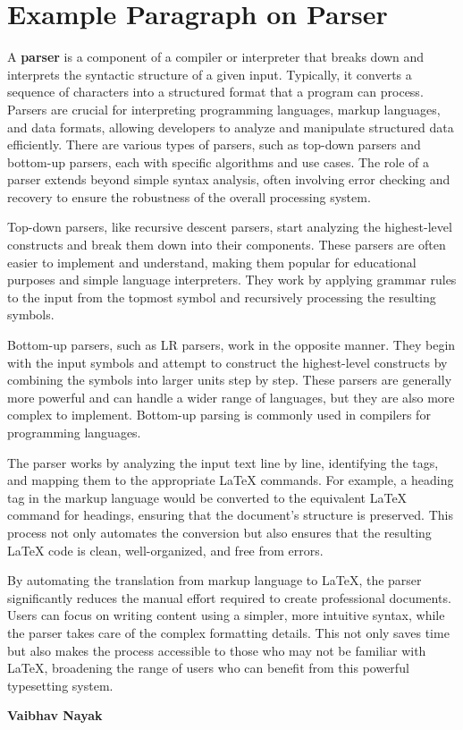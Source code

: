 \documentclass[oneside]{book}
\begin{document}
\section{Example Paragraph on Parser}
A \textbf{parser} is a component of a compiler or interpreter that breaks down and interprets the syntactic structure of a given input. Typically, it converts a sequence
        of characters into a structured format that a program can process. Parsers are crucial for interpreting programming languages, markup languages, and data formats,
        allowing developers to analyze and manipulate structured data efficiently. There are various types of parsers, such as top-down parsers and bottom-up parsers,
        each with specific algorithms and use cases. The role of a parser extends beyond simple syntax analysis, often involving error checking and recovery to ensure the 
        robustness of the overall processing system.\par
Top-down parsers, like recursive descent parsers, start analyzing the highest-level constructs and break them down into their components. These parsers are often
        easier to implement and understand, making them popular for educational purposes and simple language interpreters. They work by applying grammar rules to the input
        from the topmost symbol and recursively processing the resulting symbols.\par
Bottom-up parsers, such as LR parsers, work in the opposite manner. They begin with the input symbols and attempt to construct the highest-level constructs by
        combining the symbols into larger units step by step. These parsers are generally more powerful and can handle a wider range of languages, but they are also more
        complex to implement. Bottom-up parsing is commonly used in compilers for programming languages.\par
The parser works by analyzing the input text line by line, identifying the tags, and mapping them to the appropriate LaTeX commands. For example, a heading tag in 
        the markup language would be converted to the equivalent LaTeX command for headings, ensuring that the document's structure is preserved. This process not only
        automates the conversion but also ensures that the resulting LaTeX code is clean, well-organized, and free from errors.\par
By automating the translation from markup language to LaTeX, the parser significantly reduces the manual effort required to create professional documents.
         Users can focus on writing content using a simpler, more intuitive syntax, while the parser takes care of the complex formatting details.
          This not only saves time but also makes the process accessible to those who may not be familiar with LaTeX, broadening the range of users who can benefit from this powerful typesetting system.\par
\hfill \textbf{Vaibhav Nayak}
\date{2024-06-17}
\end{document}
